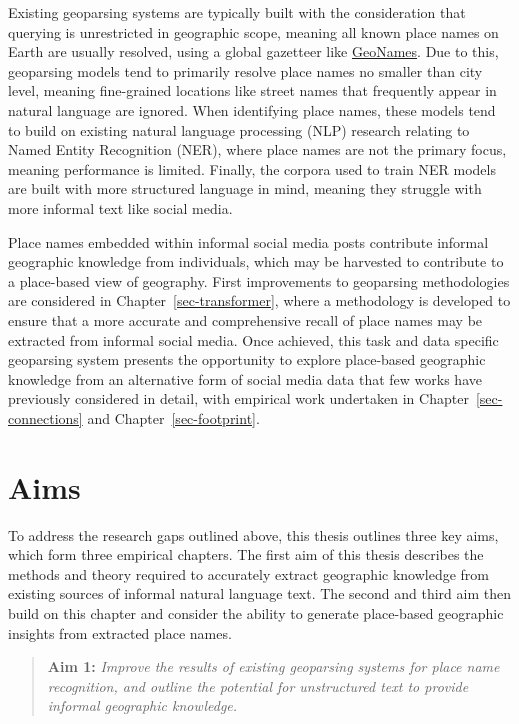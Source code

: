 \documentclass[
  letterpaper,
  11pt,
  english,
  onehalfspacing,
  headsepline]{MastersDoctoralThesis}
\begin{document}
Existing geoparsing systems are typically built with the consideration
that querying is unrestricted in geographic scope, meaning all known
place names on Earth are usually resolved, using a global gazetteer like
\href{https://geonames.org}{GeoNames}. Due to this, geoparsing models
tend to primarily resolve place names no smaller than city level,
meaning fine-grained locations like street names that frequently appear
in natural language are ignored. When identifying place names, these
models tend to build on existing natural language processing (NLP)
research relating to Named Entity Recognition (NER), where place names
are not the primary focus, meaning performance is limited. Finally, the
corpora used to train NER models are built with more structured language
in mind, meaning they struggle with more informal text like social
media.

Place names embedded within informal social media posts contribute
informal geographic knowledge from individuals, which may be harvested
to contribute to a place-based view of geography. First improvements to
geoparsing methodologies are considered in
Chapter~\ref{sec-transformer}, where a methodology is developed to
ensure that a more accurate and comprehensive recall of place names may
be extracted from informal social media. Once achieved, this task and
data specific geoparsing system presents the opportunity to explore
place-based geographic knowledge from an alternative form of social
media data that few works have previously considered in detail, with
empirical work undertaken in Chapter~\ref{sec-connections} and
Chapter~\ref{sec-footprint}.

\hypertarget{aims}{%
\section{Aims}\label{aims}}

To address the research gaps outlined above, this thesis outlines three
key aims, which form three empirical chapters. The first aim of this
thesis describes the methods and theory required to accurately extract
geographic knowledge from existing sources of informal natural language
text. The second and third aim then build on this chapter and consider
the ability to generate place-based geographic insights from extracted
place names.

\begin{quote}
\textbf{Aim 1:} \emph{Improve the results of existing geoparsing systems
for place name recognition, and outline the potential for unstructured
text to provide informal geographic knowledge.}
\end{quote}
\end{document}
